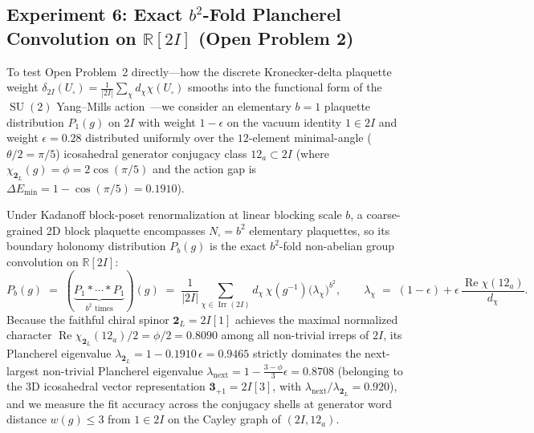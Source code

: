 \documentclass[11pt,a4paper]{article}
\theoremstyle{definition}
\theoremstyle{remark}
\newcommand{\R}{\mathbb{R}}
\newcommand{\Irr}{\operatorname{Irr}}
\newcommand{\SU}{\operatorname{SU}}
\begin{document}
\subsection{Experiment 6: Exact \texorpdfstring{$b^2$-Fold Plancherel Convolution on $\R[2I]$}{b2-Fold Plancherel Convolution on R[2I]} (Open Problem 2)}

To test Open Problem~2 directly---how the discrete Kronecker-delta plaquette weight $\delta_{2I}(U_\square) = \frac{1}{|2I|}\sum_\chi d_\chi \chi(U_\square)$ smooths into the functional form of the $\SU(2)$ Yang--Mills action~\cite{PetcherWeingarten1980}---we consider an elementary $b = 1$ plaquette distribution $P_1(g)$ on $2I$ with weight $1 - \epsilon$ on the vacuum identity $1 \in 2I$ and weight $\epsilon = 0.28$ distributed uniformly over the $12$-element minimal-angle ($\theta/2 = \pi/5$) icosahedral generator conjugacy class $12_a \subset 2I$ (where $\chi_{\mathbf{2}_L}(g) = \phi = 2\cos(\pi/5)$ and the action gap is $\Delta E_{\min} = 1 - \cos(\pi/5) = 0.1910$).

Under Kadanoff block-poset renormalization at linear blocking scale $b$, a coarse-grained 2D block plaquette encompasses $N_\square = b^2$ elementary plaquettes, so its boundary holonomy distribution $P_b(g)$ is the exact $b^2$-fold non-abelian group convolution on $\R[2I]$:
\begin{equation}
\label{eq:plancherel_convolution}
P_b(g) \;=\; (\underbrace{P_1 * \cdots * P_1}_{b^2\text{ times}})(g) \;=\; \frac{1}{|2I|} \sum_{\chi \in \Irr(2I)} d_\chi\,\chi(g^{-1}) \bigl(\lambda_\chi\bigr)^{b^2}, \qquad
\lambda_\chi \;=\; (1 - \epsilon) + \epsilon\,\frac{\operatorname{Re}\chi(12_a)}{d_\chi}.
\end{equation}
Because the faithful chiral spinor $\mathbf{2}_L = 2I[1]$ achieves the maximal normalized character $\operatorname{Re}\chi_{\mathbf{2}_L}(12_a)/2 = \phi/2 = 0.8090$ among all non-trivial irreps of $2I$, its Plancherel eigenvalue $\lambda_{\mathbf{2}_L} = 1 - 0.1910\,\epsilon = 0.9465$ strictly dominates the next-largest non-trivial Plancherel eigenvalue $\lambda_{\mathrm{next}} = 1 - \frac{3-\phi}{3}\epsilon = 0.8708$ (belonging to the 3D icosahedral vector representation $\mathbf{3}_{+1} = 2I[3]$, with $\lambda_{\mathrm{next}} / \lambda_{\mathbf{2}_L} = 0.920$), and we measure the fit accuracy across the conjugacy shells at generator word distance $w(g) \le 3$ from $1 \in 2I$ on the Cayley graph of $(2I, 12_a)$.
\end{document}
